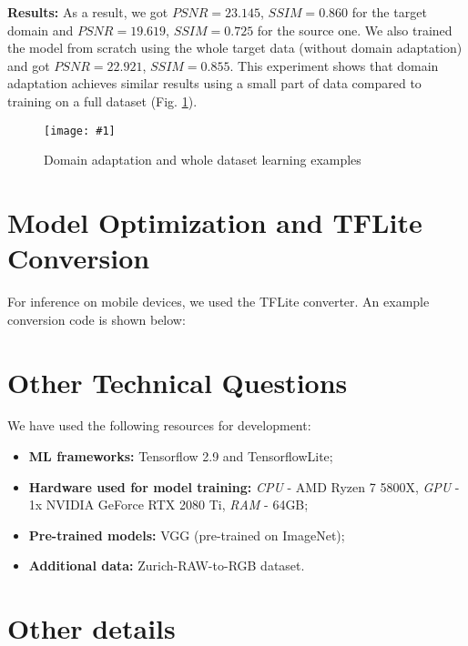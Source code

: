 \documentclass{article}
\newcommand{\addimghere}[4]{ %
    \begin{figure}[H]
        \centering
        \texttt{[image: \#1]}
        \caption{#3} \label{#4}
    \end{figure}
}
\begin{document}
\textbf{Results:} As a result, we got $PSNR=23.145$, $SSIM=0.860$ for the target domain and $PSNR=19.619$, $SSIM=0.725$ for the source one. We also trained the model from scratch using the whole target data (without domain adaptation) and got $PSNR=22.921$, $SSIM=0.855$. This experiment shows that domain adaptation achieves similar results using a small part of data compared to training on a full dataset (Fig. \ref{dann-example}).

\addimghere{dann-example}{0.9}{Domain adaptation and whole dataset learning examples}{dann-example}

\smallskip

\section{Model Optimization and TFLite Conversion}

\bigskip

For inference on mobile devices, we used the TFLite converter. An example conversion code is shown below:



\smallskip

\section{Other Technical Questions}

\bigskip

We have used the following resources for development:

\begin{itemize}
\item \textbf{ML frameworks:} Tensorflow 2.9 and TensorflowLite;
\item \textbf{Hardware used for model training:} \textit{CPU} - AMD Ryzen 7 5800X, \textit{GPU} - 1x NVIDIA GeForce RTX 2080 Ti, \textit{RAM} - 64GB;
\item \textbf{Pre-trained models:} VGG (pre-trained on ImageNet);
\item \textbf{Additional data:} Zurich-RAW-to-RGB dataset.
\end{itemize}

\smallskip

\section{Other details}

\bigskip
\end{document}

